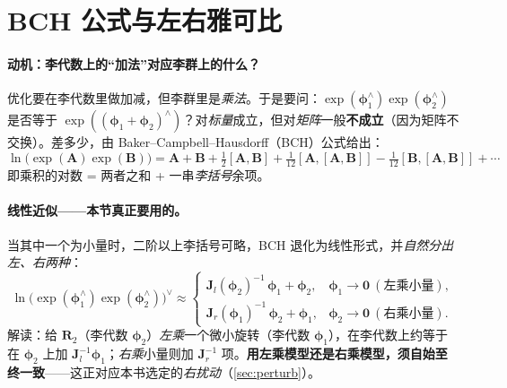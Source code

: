\section{BCH 公式与左右雅可比}
\label{sec:bch}

\paragraph{动机：李代数上的“加法”对应李群上的什么？}
优化要在李代数里做加减，但李群里是\emph{乘法}。于是要问：$\exp(\boldsymbol{\phi}_1^\wedge)\exp(\boldsymbol{\phi}_2^\wedge)$ 是否等于 $\exp((\boldsymbol{\phi}_1+\boldsymbol{\phi}_2)^\wedge)$？对\emph{标量}成立，但对\emph{矩阵}一般\textbf{不成立}（因为矩阵不交换）。差多少，由 Baker–Campbell–Hausdorff（BCH）公式给出：
\begin{equation}
  \ln\big(\exp(\mathbf{A})\exp(\mathbf{B})\big)=\mathbf{A}+\mathbf{B}+\tfrac12[\mathbf{A},\mathbf{B}]+\tfrac1{12}[\mathbf{A},[\mathbf{A},\mathbf{B}]]-\tfrac1{12}[\mathbf{B},[\mathbf{A},\mathbf{B}]]+\cdots
  \label{eq:bch}
\end{equation}
即乘积的对数 = 两者之和 + 一串\emph{李括号}余项。

\paragraph{线性近似——本节真正要用的。}
当其中一个为小量时，二阶以上李括号可略，BCH 退化为线性形式，并\emph{自然分出左、右两种}\cite{gaoxiang2019slam14}：
\begin{equation}
  \ln\!\big(\exp(\boldsymbol{\phi}_1^\wedge)\exp(\boldsymbol{\phi}_2^\wedge)\big)^\vee\approx
  \begin{cases}
    \mathbf{J}_l(\boldsymbol{\phi}_2)^{-1}\,\boldsymbol{\phi}_1+\boldsymbol{\phi}_2, & \boldsymbol{\phi}_1\to\mathbf{0}\ (\text{左乘小量}),\\[2pt]
    \mathbf{J}_r(\boldsymbol{\phi}_1)^{-1}\,\boldsymbol{\phi}_2+\boldsymbol{\phi}_1, & \boldsymbol{\phi}_2\to\mathbf{0}\ (\text{右乘小量}).
  \end{cases}
  \label{eq:bch-linear}
\end{equation}
解读：给 $\mathbf{R}_2$（李代数 $\boldsymbol{\phi}_2$）\emph{左乘}一个微小旋转（李代数 $\boldsymbol{\phi}_1$），在李代数上约等于在 $\boldsymbol{\phi}_2$ 上加 $\mathbf{J}_l^{-1}\boldsymbol{\phi}_1$；\emph{右乘}小量则加 $\mathbf{J}_r^{-1}$ 项。\textbf{用左乘模型还是右乘模型，须自始至终一致}——这正对应本书选定的\emph{右扰动}（\cref{sec:perturb}）。

